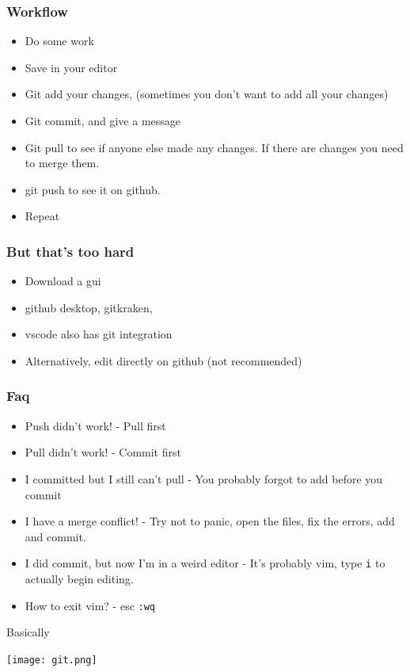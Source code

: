 \documentclass[aspectratio=169,hyperref={unicode}]{beamer}
\begin{document}
\begin{frame}
\frametitle{Workflow}
\begin{itemize}
  \item Do some work
        \item Save in your editor
        \item Git add your changes, (sometimes you don't want to add all your changes)
        \item Git commit, and give a message

        \item Git pull to see if anyone else made any changes. If there are changes you need to merge them.
        \item git push to see it on github.
        \item Repeat
\end{itemize}
\end{frame}

\begin{frame}
\frametitle{But that's too hard}
\begin{itemize}
  \item Download a gui
        \item github desktop, gitkraken,
        \item vscode also has git integration
        \item  Alternatively, edit directly on github (not recommended)
\end{itemize}
\end{frame}


\begin{frame}
\frametitle{Faq}
\begin{itemize}
\item Push didn't work! - Pull first
\item Pull didn't work! - Commit first
        \item I committed but I still can't pull - You probably forgot to add before you commit
\item I have a merge conflict! - Try not to panic, open the files, fix the errors, add and commit.
        \item I did commit, but now I'm in a weird editor - It's probably vim, type \texttt{i} to actually begin editing.
        \item How to exit vim? - esc \texttt{:wq}
\end{itemize}
\end{frame}


\begin{frame}{Basically}


\texttt{[image: git.png]}
\end{frame}
\end{document}
